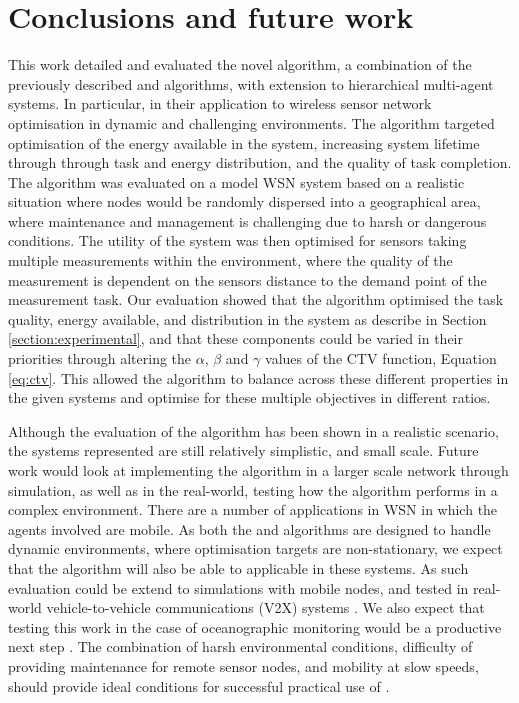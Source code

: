 \section{Conclusions and future work}
\label{section:conclusions}

This work detailed and evaluated the novel \acronymWSNOptimisation{}{} algorithm, a combination of the previously described \acronymATARIA{}{} and \acronymMGRAO{}{} algorithms, with extension to hierarchical multi-agent systems. In particular, in their application to wireless sensor network optimisation in dynamic and challenging environments. The algorithm targeted optimisation of the energy available in the system, increasing system lifetime through through task and energy distribution, and the quality of task completion. The algorithm was evaluated on a model WSN system based on a realistic situation where nodes would be randomly dispersed into a geographical area, where maintenance and management is challenging due to harsh or dangerous conditions. The utility of the system was then optimised for sensors taking multiple measurements within the environment, where the quality of the measurement is dependent on the sensors distance to the demand point of the measurement task. Our evaluation showed that the \acronymWSNOptimisation{}{} algorithm optimised the task quality, energy available, and distribution in the system as describe in Section \ref{section:experimental}, and that these components could be varied in their priorities through altering the $\alpha$, $\beta$ and $\gamma$ values of the CTV function, Equation \ref{eq:ctv}. This allowed the algorithm to balance across these different properties in the given systems and optimise for these multiple objectives in different ratios. 

Although the evaluation of the algorithm has been shown in a realistic scenario, the systems represented are still relatively simplistic, and small scale. Future work would look at implementing the algorithm in a larger scale network through simulation, as well as in the real-world, testing how the algorithm performs in a complex environment. There are a number of applications in WSN in which the agents involved are mobile. As both the \acronymATARIA{}{} and \acronymMGRAO{}{} algorithms are designed to handle dynamic environments, where optimisation targets are non-stationary, we expect that the \acronymWSNOptimisation{}{} algorithm will also be able to applicable in these systems. As such evaluation could be extend to simulations with mobile nodes, and tested in real-world vehicle-to-vehicle communications (V2X) systems \citep{Gupta2017, Tong2019}. We also expect that testing this work in the case of oceanographic monitoring would be a productive next step \citep{Albaladejo2010a}. The combination of harsh environmental conditions, difficulty of providing maintenance for remote sensor nodes, and mobility at slow speeds, should provide ideal conditions for successful practical use of \acronymWSNOptimisation{}{}.


  